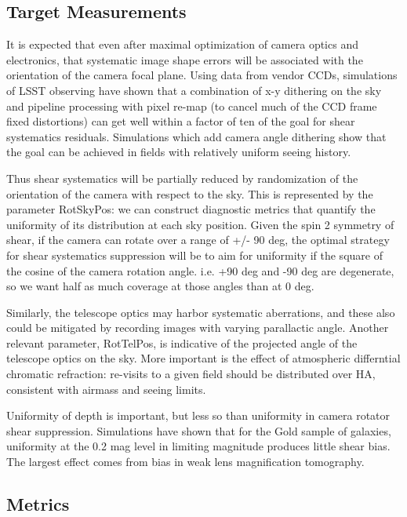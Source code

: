 \subsection{Target Measurements}

It is expected that even after maximal optimization of camera optics
and electronics, that systematic image shape errors will be associated
with the orientation of the camera focal plane.  Using data from vendor CCDs, simulations
of LSST observing have shown that a combination of x-y dithering on the sky and
pipeline processing with pixel re-map (to cancel much of the CCD frame fixed
distortions) can get well within a factor of ten of the goal for shear
systematics residuals.  Simulations which add camera angle dithering show
that the goal can be achieved in fields with relatively uniform seeing history.

Thus shear systematics will be partially reduced by randomization of the
orientation of the camera with respect to the sky.  This is
represented by the parameter RotSkyPos: we can construct diagnostic
metrics that quantify the uniformity of its distribution at each sky
position.   Given the spin 2 symmetry of shear, if the camera can rotate over a range of +/-
90 deg, the optimal strategy for shear systematics suppression will be to aim for
uniformity if the square of the cosine of the camera rotation angle.  i.e. +90 deg
and -90 deg are degenerate, so we want half as much coverage at those angles than at 0 deg.

Similarly, the telescope optics may harbor systematic aberrations, and
these also could be mitigated by recording images with varying
parallactic angle.  Another relevant parameter, RotTelPos, is
indicative of the projected angle of the telescope optics on the sky. More
important is the effect of atmospheric differntial chromatic refraction: re-visits to a given
field should be distributed over HA, consistent with airmass and seeing limits.

Uniformity of depth is important, but less so than uniformity in camera
rotator shear suppression.  Simulations have shown that for the Gold sample of galaxies,
uniformity at the 0.2 mag level in limiting magnitude produces little shear bias. The
largest effect comes from bias in weak lens magnification tomography.


\subsection{Metrics}

